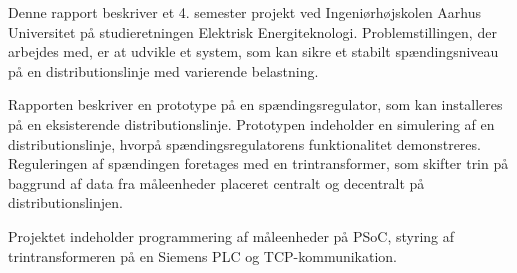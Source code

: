 
Denne rapport beskriver et 4. semester projekt ved Ingeniørhøjskolen Aarhus Universitet på studieretningen Elektrisk Energiteknologi. Problemstillingen, der arbejdes med, er at udvikle et system, som kan sikre et stabilt spændingsniveau på en distributionslinje med varierende belastning.

Rapporten beskriver en prototype på en spændingsregulator, som kan installeres på en eksisterende distributionslinje. Prototypen indeholder en simulering af en distributionslinje, hvorpå spændingsregulatorens funktionalitet demonstreres. Reguleringen af spændingen foretages med en trintransformer, som skifter trin på baggrund af data fra måleenheder placeret centralt og decentralt på distributionslinjen.

Projektet indeholder programmering af måleenheder på PSoC, styring af trintransformeren på en Siemens PLC og TCP-kommunikation. 